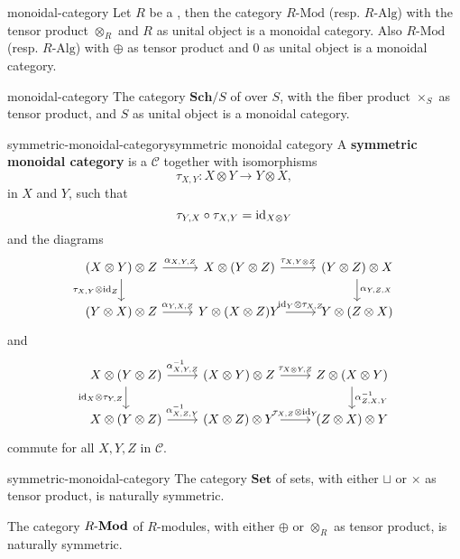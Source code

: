 \begin{example}{monoidal-category}
    Let $R$ be a , then the category $R\text{-Mod}$ (resp. $R\text{-Alg}$) with the tensor product $\otimes_R$ and $R$ as unital object is a monoidal category. Also $R\text{-Mod}$ (resp. $R\text{-Alg}$) with $\oplus$ as tensor product and $0$ as unital object is a monoidal category.
\end{example}

\begin{example}{monoidal-category}
    The category $\textbf{Sch}/S$ of  over $S$, with the fiber product $\times_S$ as tensor product, and $S$ as unital object is a monoidal category.
\end{example}

\begin{topic}{symmetric-monoidal-category}{symmetric monoidal category}
    A \textbf{symmetric monoidal category} is a  $\mathcal{C}$ together with isomorphisms
    \[ \tau_{X, Y} : X \otimes Y \to Y \otimes X , \]
     in $X$ and $Y$, such that
    \[ \tau_{Y, X} \circ \tau_{X, Y} = \textup{id}_{X \otimes Y} \]
    and the diagrams
    \[ \begin{tikzcd}
        (X \otimes Y) \otimes Z \arrow{r}{\alpha_{X, Y, Z}} \arrow[swap]{d}{\tau_{X, Y} \otimes \id_Z} & X \otimes (Y \otimes Z) \arrow{r}{\tau_{X, Y \otimes Z}} & (Y \otimes Z) \otimes X \arrow{d}{\alpha_{Y, Z, X}} \\ (Y \otimes X) \otimes Z \arrow{r}{\alpha_{Y, X, Z}} & Y \otimes (X \otimes Z) \arrow{r}{\id_Y \otimes \tau_{X, Z}} Y & Y \otimes (Z \otimes X)
    \end{tikzcd} \]
    and
    \[ \begin{tikzcd}
        X \otimes (Y \otimes Z) \arrow{r}{\alpha^{-1}_{X, Y, Z}} \arrow[swap]{d}{\id_X \otimes \tau_{Y, Z}} & (X \otimes Y) \otimes Z \arrow{r}{\tau_{X \otimes Y, Z}} & Z \otimes (X \otimes Y) \arrow{d}{\alpha^{-1}_{Z, X, Y}} \\ X \otimes (Y \otimes Z) \arrow{r}{\alpha^{-1}_{X, Z, Y}} & (X \otimes Z) \otimes Y \arrow{r}{\tau_{X, Z} \otimes \id_Y} & (Z \otimes X) \otimes Y
    \end{tikzcd} \]
    commute for all $X, Y, Z$ in $\mathcal{C}$.
\end{topic}

\begin{example}{symmetric-monoidal-category}
    The category $\textbf{Set}$ of sets, with either $\sqcup$ or $\times$ as tensor product, is naturally symmetric.
    
    The category $R\textup{-}\textbf{Mod}$ of $R$-modules, with either $\oplus$ or $\otimes_R$ as tensor product, is naturally symmetric.
\end{example}

